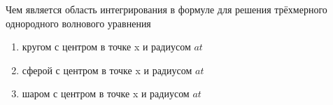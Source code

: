 Чем является область интегрирования в формуле для решения трёхмерного однородного волнового уравнения

\begin{enumerate}[label=\arabic*)]
    \item кругом с центром в точке x и радиусом \(at\)
    \item сферой с центром в точке x и радиусом \(at\)
    \item шаром с центром в точке x и радиусом \(at\)
\end{enumerate}

